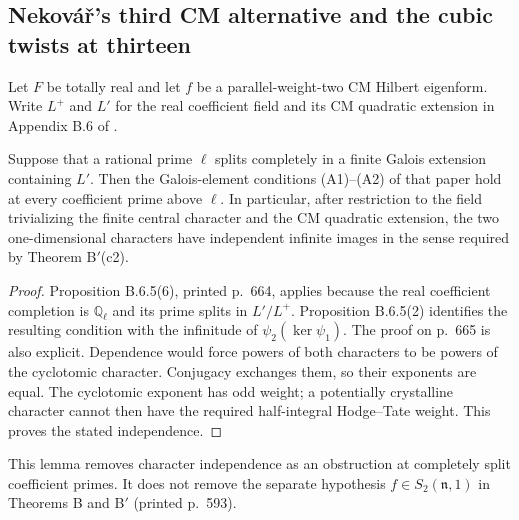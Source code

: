 \subsection{Nekov\'a\v r's third CM alternative and the cubic twists at thirteen}

Let $F$ be totally real and let $f$ be a parallel-weight-two CM
Hilbert eigenform.  Write $L^+$ and $L'$ for the real coefficient
field and its CM quadratic extension in Appendix B.6 of
\citet[Appendix~B.6]{Nekovar2012}.

\begin{lemma}
\label{lem:thirteen-split-coefficient}
Suppose that a rational prime $\ell$ splits completely in a
finite Galois extension containing $L'$.  Then the Galois-element
conditions (A1)--(A2) of that paper hold at every coefficient
prime above $\ell$.  In particular, after restriction to the
field trivializing the finite central character and the CM
quadratic extension, the two one-dimensional characters have
independent infinite images in the sense required by
Theorem B$'$(c2).
\end{lemma}
\begin{proof}
Proposition B.6.5(6), printed p.~664, applies because the real
coefficient completion is $\mathbb Q_\ell$ and its prime splits
in $L'/L^+$.  Proposition B.6.5(2) identifies the resulting
condition with the infinitude of $\psi_2(\ker\psi_1)$.
The proof on p.~665 is also explicit.  Dependence would force
powers of both characters to be powers of the cyclotomic
character.  Conjugacy exchanges them, so their exponents are
equal.  The cyclotomic exponent has odd weight; a potentially
crystalline character cannot then have the required half-integral
Hodge--Tate weight.  This proves the stated independence.
\end{proof}

This lemma removes character independence as an obstruction at
completely split coefficient primes.  It does not remove the
separate hypothesis $f\in S_2(\mathfrak n,1)$ in Theorems B and
B$'$ (printed p.~593).

